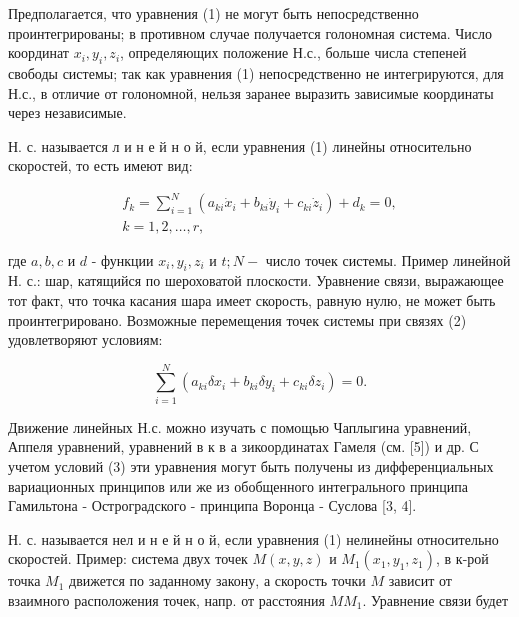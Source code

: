 \documentclass[10pt]{article}
\begin{document}
Предполагается, что уравнения (1) не могут быть непосредственно проинтегрированы; в противном случае получается голономная система. Число координат $x_{i}, y_{i}, z_{i}$, определяющих положение Н.с., больше числа степеней свободы системы; так как уравнения (1) непосредственно не интегрируются, для Н.с., в отличие от голономной, нельзя заранее выразить зависимые координаты через независимые.



Н. с. называется л и н е й н о й, если уравнения (1) линейны относительно скоростей, то есть имеют вид:



\[

\begin{gathered}

f_{k}=\sum_{i=1}^{N}\left(a_{k i} \dot{x}_{i}+b_{k i} \dot{y}_{i}+c_{k i} \dot{z}_{i}\right)+d_{k}=0, \\

k=1,2, \ldots, r,

\end{gathered}

\]



где $a, b, c$ и $d$ - функции $x_{i}, y_{i}, z_{i}$ и $t ; N-$ число точек системы. Пример линейной Н. с.: шар, катящийся по шероховатой плоскости. Уравнение связи, выражающее тот факт, что точка касания шара имеет скорость, равную нулю, не может быть проинтегрировано. Возможные перемещения точек системы при связях (2) удовлетворяют условиям:



\[

\sum_{i=1}^{N}\left(a_{k i} \delta x_{i}+b_{k i} \delta y_{i}+c_{k i} \delta z_{i}\right)=0 .

\]



Движение линейных Н.с. можно изучать с помощью Чаплыгина уравнений, Аппеля уравнений, уравнений в к в а зикоординатах Гамеля (см. [5]) и др. С учетом условий (3) эти уравнения могут быть получены из дифференциальных вариационных принципов или же из обобщенного интегрального принципа Гамильтона - Остроградского - принципа Воронца - Суслова [3, 4].



Н. с. называется нел и н е й н о й, если уравнения (1) нелинейны относительно скоростей. Пример: система двух точек $M(x, y, z)$ и $M_{1}\left(x_{1}, y_{1}, z_{1}\right)$, в к-рой точка $M_{1}$ движется по заданному закону, а скорость точки $M$ зависит от взаимного расположения точек, напр. от расстояния $M M_{1}$. Уравнение связи будет
\end{document}
